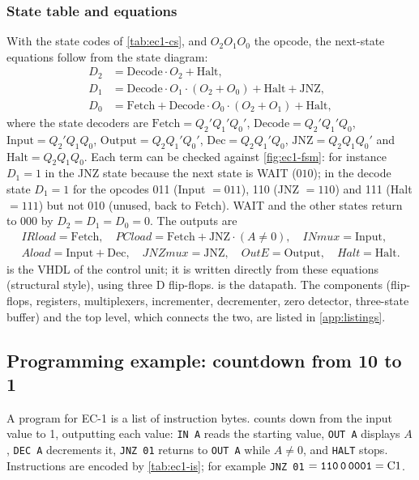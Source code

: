 \subsubsection{State table and equations}
With the state codes of \cref{tab:ec1-cs}, and $O_2O_1O_0$ the opcode, the next-state equations follow from the state diagram:
\begin{align*}
 D_2 &= \mathrm{Decode}\cdot O_2 + \mathrm{Halt},\\
 D_1 &= \mathrm{Decode}\cdot O_1\cdot(O_2+O_0) + \mathrm{Halt} + \mathrm{JNZ},\\
 D_0 &= \mathrm{Fetch} + \mathrm{Decode}\cdot O_0\cdot(O_2+O_1) + \mathrm{Halt},
\end{align*}
where the state decoders are $\mathrm{Fetch}=Q_2'Q_1'Q_0'$, $\mathrm{Decode}=Q_2'Q_1'Q_0$, $\mathrm{Input}=Q_2'Q_1Q_0$, $\mathrm{Output}=Q_2Q_1'Q_0'$, $\mathrm{Dec}=Q_2Q_1'Q_0$, $\mathrm{JNZ}=Q_2Q_1Q_0'$ and $\mathrm{Halt}=Q_2Q_1Q_0$. Each term can be checked against \cref{fig:ec1-fsm}: for instance $D_1=1$ in the JNZ state because the next state is WAIT ($010$); in the decode state $D_1=1$ for the opcodes 011 (Input $=011$), 110 (JNZ $=110$) and 111 (Halt $=111$) but not 010 (unused, back to Fetch). WAIT and the other states return to $000$ by $D_2=D_1=D_0=0$. The outputs are
\begin{gather*}
 IRload = \mathrm{Fetch},\quad PCload = \mathrm{Fetch} + \mathrm{JNZ}\cdot(A\neq0),\quad INmux = \mathrm{Input},\\
 Aload = \mathrm{Input}+\mathrm{Dec},\quad JNZmux=\mathrm{JNZ},\quad OutE=\mathrm{Output},\quad Halt=\mathrm{Halt}.
\end{gather*}
 is the VHDL of the control unit; it is written directly from these equations (structural style), using three D flip-flops.  is the datapath. The components (flip-flops, registers, multiplexers, incrementer, decrementer, zero detector, three-state buffer) and the top level, which connects the two, are listed in \cref{app:listings}.


\subsection{Programming example: countdown from 10 to 1}
A program for EC-1 is a list of instruction bytes.  counts down from the input value to 1, outputting each value: \texttt{IN A} reads the starting value, \texttt{OUT A} displays $A$, \texttt{DEC A} decrements it, \texttt{JNZ 01} returns to \texttt{OUT A} while $A\neq0$, and \texttt{HALT} stops. Instructions are encoded by \cref{tab:ec1-is}; for example \texttt{JNZ 01} $=\texttt{110\,0\,0001}=\mathrm{C1}$.

